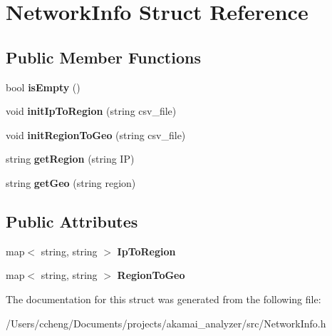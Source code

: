 \hypertarget{struct_network_info}{}\section{Network\+Info Struct Reference}
\label{struct_network_info}
\subsection*{Public Member Functions}
\begin{DoxyCompactItemize}
\item 
\mbox{\label{struct_network_info_a44900ff326a66b38e655927ff3135e7d}} 
bool {\bfseries is\+Empty} ()
\item 
\mbox{\label{struct_network_info_a838d52f7f019e50c926752d2337b1d67}} 
void {\bfseries init\+Ip\+To\+Region} (string csv\+\_\+file)
\item 
\mbox{\label{struct_network_info_a3a2a6df513fcdf5e7dccb12582821175}} 
void {\bfseries init\+Region\+To\+Geo} (string csv\+\_\+file)
\item 
\mbox{\label{struct_network_info_aebae6f4c762ce6467a07fa6f702cc11c}} 
string {\bfseries get\+Region} (string IP)
\item 
\mbox{\label{struct_network_info_aa034823ffc797fe3db64b46a9592747f}} 
string {\bfseries get\+Geo} (string region)
\end{DoxyCompactItemize}
\subsection*{Public Attributes}
\begin{DoxyCompactItemize}
\item 
\mbox{\label{struct_network_info_a234f8dac6c935838cdaa52e6b803cd1f}} 
map$<$ string, string $>$ {\bfseries Ip\+To\+Region}
\item 
\mbox{\label{struct_network_info_ae85b2fca3d6ef8c021f5ba5d5a3e8cc9}} 
map$<$ string, string $>$ {\bfseries Region\+To\+Geo}
\end{DoxyCompactItemize}


The documentation for this struct was generated from the following file\+:\begin{DoxyCompactItemize}
\item 
/\+Users/ccheng/\+Documents/projects/akamai\+\_\+analyzer/src/Network\+Info.\+h\end{DoxyCompactItemize}
